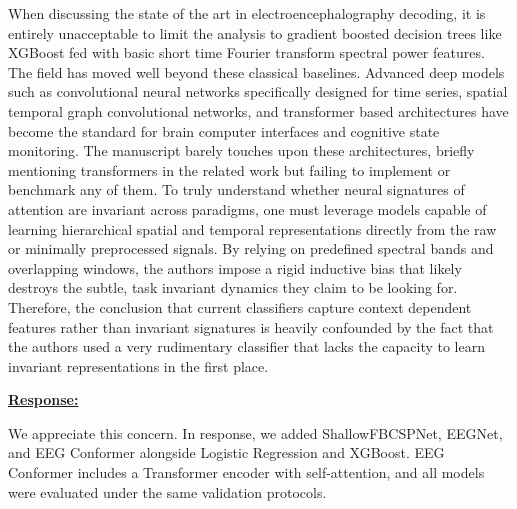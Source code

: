 \documentclass{article}
\begin{document}
\vspace{0.3cm}


\begin{cmt}{}{}

When discussing the state of the art in electroencephalography decoding, it is
entirely unacceptable to limit the analysis to gradient boosted decision trees
like XGBoost fed with basic short time Fourier transform spectral power
features. The field has moved well beyond these classical baselines. Advanced
deep models such as convolutional neural networks specifically designed for time
series, spatial temporal graph convolutional networks, and transformer based
architectures have become the standard for brain computer interfaces and
cognitive state monitoring. The manuscript barely touches upon these
architectures, briefly mentioning transformers in the related work but failing
to implement or benchmark any of them. To truly understand whether neural
signatures of attention are invariant across paradigms, one must leverage models
capable of learning hierarchical spatial and temporal representations directly
from the raw or minimally preprocessed signals. By relying on predefined
spectral bands and overlapping windows, the authors impose a rigid inductive
bias that likely destroys the subtle, task invariant dynamics they claim to be
looking for. Therefore, the conclusion that current classifiers capture context
dependent features rather than invariant signatures is heavily confounded by the
fact that the authors used a very rudimentary classifier that lacks the capacity
to learn invariant representations in the first place.

\end{cmt}
\vspace{0.1cm}
\noindent
\underline{\textbf{Response:}}
\vspace{0.2cm}

We appreciate this concern. In response, we added ShallowFBCSPNet, EEGNet, and
EEG Conformer alongside Logistic Regression and XGBoost. EEG Conformer includes
a Transformer encoder with self-attention, and all models were evaluated under
the same validation protocols.

\vspace{0.3cm}
\end{document}
